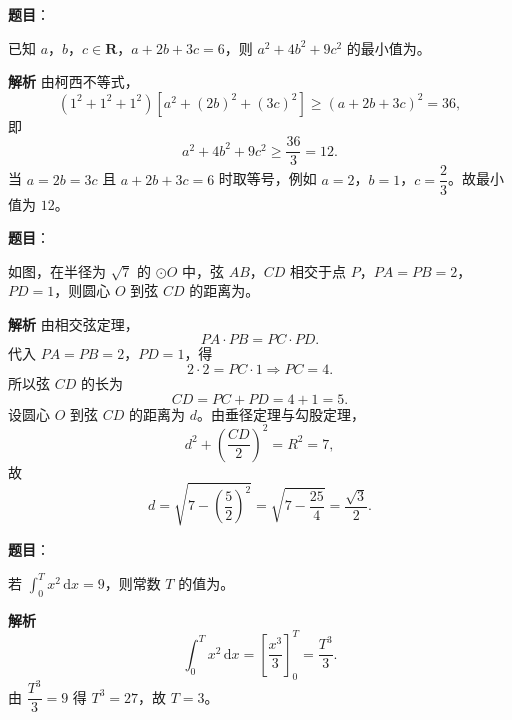 \begin{answer}

\textbf{题目}：

已知 $a$，$b$，$c\in\mathbf R$，$a+2b+3c=6$，则 $a^2+4b^2+9c^2$ 的最小值为\gkblank{}。

\textbf{解析}
由柯西不等式，
\nopagebreak[4]
\[(1^2+1^2+1^2)\left[a^2+(2b)^2+(3c)^2\right]\geqslant(a+2b+3c)^2=36,\]
即
\nopagebreak[4]
\[a^2+4b^2+9c^2\geqslant\frac{36}{3}=12.\]
当 $a=2b=3c$ 且 $a+2b+3c=6$ 时取等号，例如 $a=2$，$b=1$，$c=\dfrac23$。故最小值为 $12$。


\end{answer}
\begin{answer}

\textbf{题目}：

如图，在半径为 $\sqrt7$ 的 $\odot O$ 中，弦 $AB$，$CD$ 相交于点 $P$，$PA=PB=2$，$PD=1$，则圆心 $O$ 到弦 $CD$ 的距离为\gkblank{}。
\nopagebreak[4]
\begin{center}\end{center}
\nopagebreak[4]
\textbf{解析}
由相交弦定理，
\nopagebreak[4]
\[PA\cdot PB=PC\cdot PD.\]
代入 $PA=PB=2$，$PD=1$，得
\nopagebreak[4]
\[2\cdot2=PC\cdot1\Longrightarrow PC=4.\]
所以弦 $CD$ 的长为
\nopagebreak[4]
\[CD=PC+PD=4+1=5.\]
设圆心 $O$ 到弦 $CD$ 的距离为 $d$。由垂径定理与勾股定理，
\nopagebreak[4]
\[d^2+\left(\frac{CD}{2}\right)^2=R^2=7,\]
故
\nopagebreak[4]
\[d=\sqrt{7-\left(\frac52\right)^2}=\sqrt{7-\frac{25}{4}}=\frac{\sqrt3}{2}.\]


\end{answer}
\begin{answer}

\textbf{题目}：

若 $\displaystyle\int_0^T x^2\,\mathrm dx=9$，则常数 $T$ 的值为\gkblank{}。

\textbf{解析}
\nopagebreak[4]
\[\int_0^T x^2\,\mathrm dx=\left[\frac{x^3}{3}\right]_0^T=\frac{T^3}{3}.\]
由 $\dfrac{T^3}{3}=9$ 得 $T^3=27$，故 $T=3$。


\end{answer}
